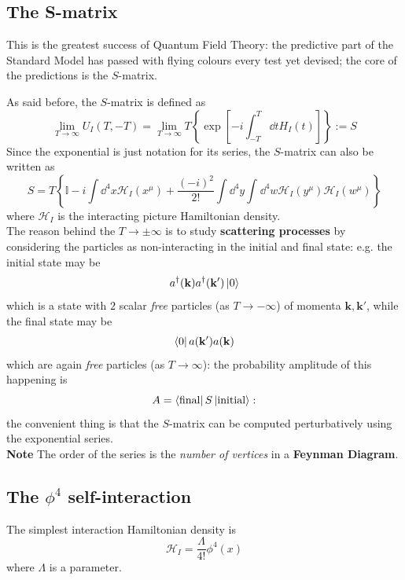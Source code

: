 \subsection{The S-matrix}
This is the greatest success of Quantum Field Theory: the predictive part
of the Standard Model has passed with flying colours every test yet devised;
the core of the predictions is the $S$-matrix.

As said before, the $S$-matrix is defined as
$$\lim\limits_{T\to\infty}U_I(T,-T)=\lim\limits_{T\to\infty}
T\left\{\exp\left[-i\int_{-T}^{T} \dd t H_I(t) \right]\right\}
:=S$$
Since the exponential is just notation for its series, the $S$-matrix can also
be written as
$$S = T\left\{\mathbb{I} -i\int \dd^4x \mathcal{H}_I(x^\mu) + \frac{(-i)^2}
{2!}\int\dd^4y\int_{}^{} \dd^4w \mathcal{H}_I(y^\mu)\mathcal{H}_I(w^\mu) 
\right\}$$
where $\mathcal{H}_I$ is the interacting picture Hamiltonian density.\\
The reason behind the $T\to\pm\infty$ is to study \textbf{scattering processes}
by considering the particles as non-interacting in the initial and final state:
e.g. the initial state may be
$$a^\dagger(\mathbf{k})a^\dagger(\mathbf{k'})\ket{0}$$
which is a state with $2$ scalar \textit{free} particles (as $T\to-\infty$) of
momenta $\mathbf{k,k'}$, while the final state may be
$$\bra{0}a(\mathbf{k'})a(\mathbf{k})$$
which are again \textit{free} particles (as $T\to\infty$): the probability
amplitude of this happening is
$$A=\bra{\text{final}}S\ket{\text{initial}}:$$
the convenient thing is that the $S$-matrix can be computed perturbatively using
the exponential series.\\
\textbf{Note} The order of the series is the \textit{number of vertices} in a
\textbf{Feynman Diagram}.
\subsection{The $\phi^4$ self-interaction}
The simplest interaction Hamiltonian density is
$$\mathcal{H}_I = \frac{\Lambda}{4!}\phi^4(x)$$
where $\Lambda$ is a parameter.

